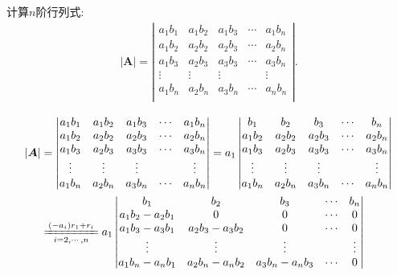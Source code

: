 \documentclass[../../main.tex]{subfiles}
\begin{document}
\begin{example}
计算$n$阶行列式:
\begin{gather}
|\boldsymbol{A}|=\left| \begin{matrix}
a_1b_1&		a_1b_2&		a_1b_3&		\cdots&		a_1b_n\\
a_1b_2&		a_2b_2&		a_2b_3&		\cdots&		a_2b_n\\
a_1b_3&		a_2b_3&		a_3b_3&		\cdots&		a_3b_n\\
\vdots&		\vdots&		\vdots&		&		\vdots\\
a_1b_n&		a_2b_n&		a_3b_n&		\cdots&		a_nb_n\\
\end{matrix} \right|.
\nonumber
\end{gather}
\begin{solution}
\begin{align*}
|\boldsymbol{A}|&=\left| \begin{matrix}
a_1b_1&		a_1b_2&		a_1b_3&		\cdots&		a_1b_n\\
a_1b_2&		a_2b_2&		a_2b_3&		\cdots&		a_2b_n\\
a_1b_3&		a_2b_3&		a_3b_3&		\cdots&		a_3b_n\\
\vdots&		\vdots&		\vdots&		&		\vdots\\
a_1b_n&		a_2b_n&		a_3b_n&		\cdots&		a_nb_n\\
\end{matrix} \right|=a_1\left| \begin{matrix}
b_1&		b_2&		b_3&		\cdots&		b_n\\
a_1b_2&		a_2b_2&		a_2b_3&		\cdots&		a_2b_n\\
a_1b_3&		a_2b_3&		a_3b_3&		\cdots&		a_3b_n\\
\vdots&		\vdots&		\vdots&		&		\vdots\\
a_1b_n&		a_2b_n&		a_3b_n&		\cdots&		a_nb_n\\
\end{matrix} \right|
\\
&\xlongequal[i=2,\cdots ,n]{\left( -a_i \right) r_1+r_i}a_1\left| \begin{matrix}
b_1&		b_2&		b_3&		\cdots&		b_n\\
a_1b_2-a_2b_1&		0&		0&		\cdots&		0\\
a_1b_3-a_3b_1&		a_2b_3-a_3b_2&		0&		\cdots&		0\\
\vdots&		\vdots&		\vdots&		&		\vdots\\
a_1b_n-a_nb_1&		a_2b_n-a_nb_2&		a_3b_n-a_nb_3&		\cdots&		0\\
\end{matrix} \right|

\end{align*}
\end{solution}
\end{example}
\end{document}
